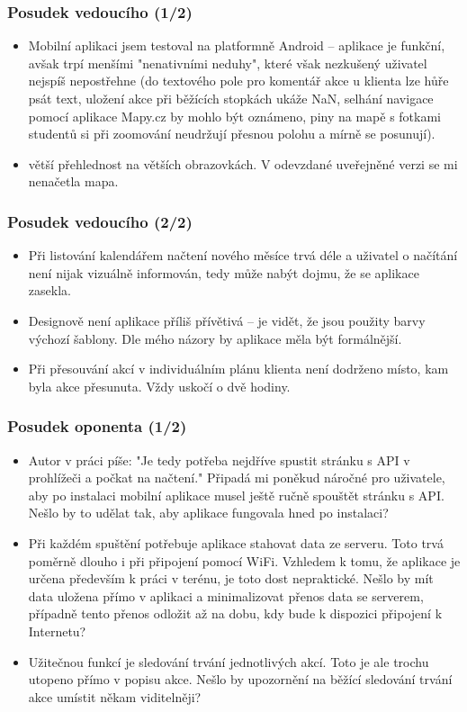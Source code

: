 \documentclass{beamer}
\begin{document}
\begin{frame}
\frametitle{Posudek vedoucího (1/2)}
\begin{itemize}
\item Mobilní aplikaci jsem testoval na platformně Android – aplikace je funkční, avšak trpí
menšími "nenativními neduhy", které však nezkušený uživatel nejspíš nepostřehne (do
textového pole pro komentář akce u klienta lze hůře psát text, uložení akce při běžících
stopkách ukáže NaN, selhání navigace pomocí aplikace Mapy.cz by mohlo být oznámeno,
piny na mapě s fotkami studentů si při zoomování neudržují přesnou polohu a mírně se
posunují).

\item větší přehlednost na větších obrazovkách. V odevzdané uveřejněné verzi se mi nenačetla
mapa.
\end{itemize}
\end{frame}
\begin{frame}
\frametitle{Posudek vedoucího (2/2)}
\begin{itemize}
\item Při listování kalendářem načtení nového měsíce trvá déle a uživatel o načítání není
nijak vizuálně informován, tedy může nabýt dojmu, že se aplikace zasekla.
\item Designově není aplikace příliš přívětivá – je vidět, že jsou použity barvy výchozí
šablony. Dle mého názory by aplikace měla být formálnější.
\item Při přesouvání akcí v individuálním plánu klienta není dodrženo místo, kam byla
akce přesunuta. Vždy uskočí o dvě hodiny.
\end{itemize}
\end{frame}

\begin{frame}
\frametitle{Posudek oponenta (1/2)}
\begin{itemize}
\item Autor v práci píše: "Je tedy potřeba nejdříve spustit stránku s API v prohlížeči a počkat
na načtení." Připadá mi poněkud náročné pro uživatele, aby po instalaci mobilní
aplikace musel ještě ručně spouštět stránku s API. Nešlo by to udělat tak, aby aplikace
fungovala hned po instalaci?

\item Při každém spuštění potřebuje aplikace stahovat data ze serveru. Toto trvá poměrně
dlouho i při připojení pomocí WiFi. Vzhledem k tomu, že aplikace je určena
především k práci v terénu, je toto dost nepraktické. Nešlo by mít data uložena přímo
v aplikaci a minimalizovat přenos data se serverem, případně tento přenos odložit až
na dobu, kdy bude k dispozici připojení k Internetu?

\item  Užitečnou funkcí je sledování trvání jednotlivých akcí. Toto je ale trochu utopeno
přímo v popisu akce. Nešlo by upozornění na běžící sledování trvání akce umístit
někam viditelněji?
\end{itemize}
\end{frame}
\end{document}
